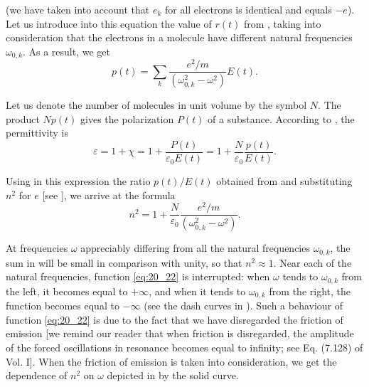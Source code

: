 \noindent
(we have taken into account that $e_k$ for all electrons is identical and equals $-e$).
Let us introduce into this equation the value of $r(t)$ from , taking into consideration that the electrons in a molecule have different natural frequencies $\omega_{0,k}$.
As a result, we get
\begin{equation}\label{eq:20_21}
	p(t) = \sum_k \frac{e^2/m}{(\omega_{0,k}^2 - \omega^2)} E(t).
\end{equation}

Let us denote the number of molecules in unit volume by the symbol $N$.
The product $Np(t)$ gives the polarization $P(t)$ of a substance.
According to , the permittivity is
\begin{equation*}
	\varepsilon = 1 + \chi = 1 + \frac{P(t)}{\varepsilon_0 E(t)} = 1 + \frac{N}{\varepsilon_0} \frac{p(t)}{E(t)}.
\end{equation*}

\noindent
Using in this expression the ratio $p(t)/E(t)$ obtained from  and substituting $n^2$ for $e$ [see ], we arrive at the formula
\begin{equation}\label{eq:20_22}
	n^2 = 1 + \frac{N}{\varepsilon_0} \frac{e^2/m}{(\omega_{0,k}^2 - \omega^2)}.
\end{equation}

At frequencies $\omega$ appreciably differing from all the natural frequencies $\omega_{0,k}$, the sum in  will be small in comparison with unity, so that $n^2\approx 1$.
Near each of the natural frequencies, function \eqref{eq:20_22} is interrupted: when $\omega$ tends to $\omega_{0,k}$ from the left, it becomes equal to $+\infty$, and when it tends to $\omega_{0,k}$ from the right, the function becomes equal to $-\infty$ (see the dash curves in ).
Such a behaviour of function \eqref{eq:20_22} is due to the fact that we have disregarded the friction of emission [we remind our reader that when friction is disregarded, the amplitude of the forced oscillations in resonance becomes equal to infinity; see Eq. (7.128) of
Vol. I].
When the friction of emission is taken into consideration, we get the dependence of $n^2$ on $\omega$ depicted in  by the solid curve.

